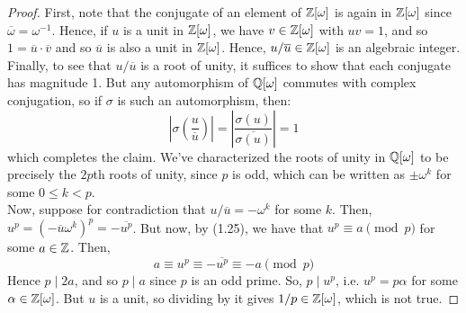 \begin{proof}
    First, note that the conjugate of an element of $\mathbb{Z}[\omega]$ is again in $\mathbb{Z}[\omega]$ since $\overline{\omega} = \omega^{-1}$. Hence, if $u$ is a unit in $\mathbb{Z}[\omega]$, we have $v \in \mathbb{Z}[\omega]$ with $uv = 1$, and so $1 = \overline{u} \cdot \overline{v}$ and so $\overline{u}$ is also a unit in $\mathbb{Z}[\omega]$. Hence, $u/\overline{u} \in \mathbb{Z}[\omega]$ is an algebraic integer. Finally, to see that $u/\overline{u}$ is a root of unity, it suffices to show that each conjugate has magnitude 1. But any automorphism of $\mathbb{Q}[\omega]$ commutes with complex conjugation, so if $\sigma$ is such an automorphism, then:
    \[ \left|\sigma\left(\frac{u}{\overline{u}}\right)\right| = \left|\frac{\sigma(u)}{\overline{\sigma(u)}}\right| = 1 \]
    which completes the claim. We've characterized the roots of unity in $\mathbb{Q}[\omega]$ to be precisely the $2p$th roots of unity, since $p$ is odd, which can be written as $\pm \omega^k$ for some $0 \leq k < p$. \\

    Now, suppose for contradiction that $u/\overline{u} = -\omega^k$ for some $k$. Then, $u^p = (-\overline{u}\omega^k)^p = -\overline{u^p}$. But now, by (1.25), we have that $u^p \equiv a \pmod{p}$ for some $a \in \mathbb{Z}$. Then,
    \[ a \equiv u^p \equiv -\overline{u^p} \equiv -a \pmod{p} \]
    Hence $p \mid 2a$, and so $p \mid a$ since $p$ is an odd prime. So, $p \mid u^p$, i.e. $u^p = p\alpha$ for some $\alpha \in \mathbb{Z}[\omega]$. But $u$ is a unit, so dividing by it gives $1/p \in \mathbb{Z}[\omega]$, which is not true.
\end{proof}
